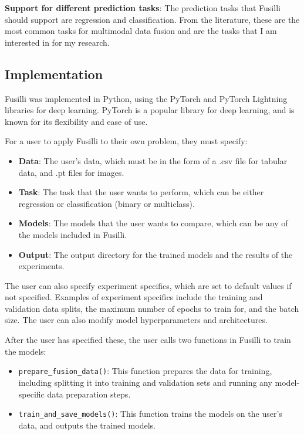 \vspace{0.3cm}

\noindent\textbf{Support for different prediction tasks}: The prediction tasks that Fusilli should support are regression and classification.
From the literature, these are the most common tasks for multimodal data fusion and are the tasks that I am interested in for my research.


\subsection{Implementation}

Fusilli was implemented in Python, using the PyTorch and PyTorch Lightning libraries for deep learning.
PyTorch is a popular library for deep learning, and is known for its flexibility and ease of use.

\noindent For a user to apply Fusilli to their own problem, they must specify:
\begin{itemize}
  \setlength\itemsep{-0.5em}
    \item \textbf{Data}: The user's data, which must be in the form of a .csv file for tabular data, and .pt files for images.
    \item \textbf{Task}: The task that the user wants to perform, which can be either regression or classification (binary or multiclass).
    \item \textbf{Models}: The models that the user wants to compare, which can be any of the models included in Fusilli.
    \item \textbf{Output}: The output directory for the trained models and the results of the experiments.
\end{itemize}

\noindent The user can also specify experiment specifics, which are set to default values if not specified.
Examples of experiment specifics include the training and validation data splits, the maximum number of epochs to train for, and the batch size.
The user can also modify model hyperparameters and architectures.

After the user has specified these, the user calls two functions in Fusilli to train the models:
\begin{itemize}
\setlength\itemsep{-0.5em}
    \item \texttt{prepare\_fusion\_data()}: This function prepares the data for training, including splitting it into training and validation sets and running any model-specific data preparation steps.
    \item \texttt{train\_and\_save\_models()}: This function trains the models on the user's data, and outputs the trained models.
\end{itemize}

